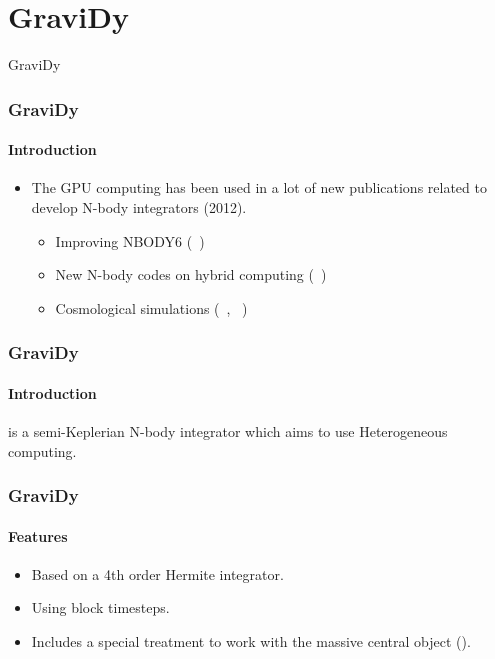 \section{GraviDy}

\begin{frame}
    \begin{center}
        {\Huge GraviDy}
    \end{center}
\end{frame}

\begin{frame}
    \frametitle{GraviDy}
    \framesubtitle{Introduction}
    \begin{itemize}
        \item The GPU computing has been used
            in a lot of new publications related to develop N-body integrators (2012).
        \begin{itemize}
            \item Improving NBODY6 (~\cite{2012MNRAS.424..545N})
            \item New N-body codes on hybrid computing (~\cite{2012arXiv1207.2367C})
            \item Cosmological simulations (~\cite{2012arXiv1208.3658B}, ~\cite{2012ASPC..453..325B})
        \end{itemize}
    \end{itemize}
\end{frame}


\begin{frame}
    \frametitle{GraviDy}
    \framesubtitle{Introduction}
    \begin{center}
         is a semi-Keplerian N-body integrator which aims
        to use Heterogeneous computing.
    \end{center}
\end{frame}

\begin{frame}
    \frametitle{GraviDy}
    \framesubtitle{Features}
    \begin{itemize}
        \item Based on a 4th order Hermite integrator.
        \item Using block timesteps.
        \item Includes a special treatment to work with the massive central object ().
    \end{itemize}
\end{frame}

